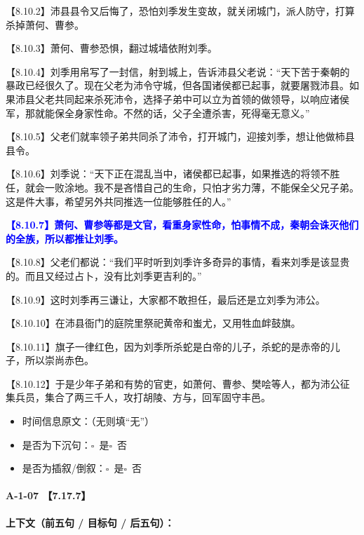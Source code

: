 \documentclass[fontset=none,11pt,a4paper]{ctexart}
\newcommand{\answerline}[1]{\underline{\hspace{#1}}}
\newcommand{\choicebox}[1]{$\square$~#1}
\begin{document}
\noindent 【8.10.2】沛县县令又后悔了，恐怕刘季发生变故，就关闭城门，派人防守，打算杀掉萧何、曹参。\par
\noindent 【8.10.3】萧何、曹参恐惧，翻过城墙依附刘季。\par
\noindent 【8.10.4】刘季用帛写了一封信，射到城上，告诉沛县父老说：“天下苦于秦朝的暴政已经很久了。现在父老为沛令守城，但各国诸侯都已起事，就要屠戮沛县。如果沛县父老共同起来杀死沛令，选择子弟中可以立为首领的做领导，以响应诸侯军，那就能保全身家性命。不然的话，父子全遭杀害，死得毫无意义。”\par
\noindent 【8.10.5】父老们就率领子弟共同杀了沛令，打开城门，迎接刘季，想让他做柿县县令。\par
\noindent 【8.10.6】刘季说：“天下正在混乱当中，诸侯都已起事，如果推选的将领不胜任，就会一败涂地。我不是吝惜自己的生命，只怕才劣力薄，不能保全父兄子弟。这是件大事，希望另外共同推选一位能够胜任的人。”\par
\noindent \textcolor{blue}{\textbf{【8.10.7】萧何、曹参等都是文官，看重身家性命，怕事情不成，秦朝会诛灭他们的全族，所以都推让刘季。}}\par
\noindent 【8.10.8】父老们都说：“我们平时听到刘季许多奇异的事情，看来刘季是该显贵的。而且又经过占卜，没有比刘季更吉利的。”\par
\noindent 【8.10.9】这时刘季再三谦让，大家都不敢担任，最后还是立刘季为沛公。\par
\noindent 【8.10.10】在沛县衙门的庭院里祭祀黄帝和蚩尤，又用牲血衅鼓旗。\par
\noindent 【8.10.11】旗子一律红色，因为刘季所杀蛇是白帝的儿子，杀蛇的是赤帝的儿子，所以崇尚赤色。\par
\noindent 【8.10.12】于是少年子弟和有势的官吏，如萧何、曹参、樊哙等人，都为沛公征集兵员，集合了两三千人，攻打胡陵、方与，回军固守丰邑。\par

\begin{itemize}
  \item 时间信息原文：\answerline{7.5cm}（无则填“无”）
  \item 是否为下沉句：\choicebox{是}\quad \choicebox{否}
  \item 是否为插叙/倒叙：\choicebox{是}\quad \choicebox{否}
\end{itemize}

\paragraph{A-1-07 \quad 【7.17.7】}
\textbf{上下文（前五句 / 目标句 / 后五句）：}
\end{document}
